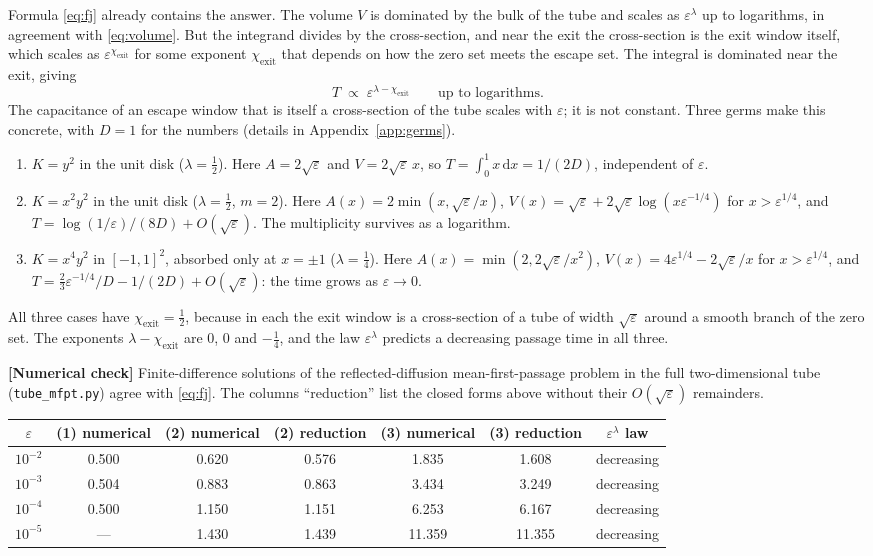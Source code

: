 \documentclass[11pt,a4paper]{article}
\newcommand{\eps}{\varepsilon}
\newcommand{\dd}{\mathrm d}
\newcommand{\chiexit}{\chi_{\mathrm{exit}}}
\newcommand{\evl}[2]{{\small\bfseries\color{#1}[#2]}}
\newcommand{\LNum}{\evl{cnum}{Numerical check}}
\begin{document}
Formula \eqref{eq:fj} already contains the answer. The volume $V$ is
dominated by the bulk of the tube and scales as $\eps^\lambda$ up to
logarithms, in agreement with \eqref{eq:volume}. But the integrand divides
by the cross-section, and near the exit the cross-section is the exit
window itself, which scales as $\eps^{\chiexit}$ for some exponent
$\chiexit$ that depends on how the zero set meets the escape set. The
integral is dominated near the exit, giving
\begin{equation}
T\;\propto\;\eps^{\lambda-\chiexit}\qquad\text{up to logarithms.}
\label{eq:scaling}
\end{equation}
The capacitance of an escape window that is itself a cross-section of the
tube scales with $\eps$; it is not constant. Three germs make this
concrete, with $D=1$ for the numbers (details in
Appendix~\ref{app:germs}).
\begin{enumerate}
\item $K=y^2$ in the unit disk ($\lambda=\tfrac12$). Here $A=2\sqrt\eps$
and $V=2\sqrt\eps\,x$, so $T=\int_0^1x\,\dd x=1/(2D)$, independent of
$\eps$.
\item $K=x^2y^2$ in the unit disk ($\lambda=\tfrac12$, $m=2$). Here
$A(x)=2\min(x,\sqrt\eps/x)$, $V(x)=\sqrt\eps+2\sqrt\eps\log(x\eps^{-1/4})$
for $x>\eps^{1/4}$, and $T=\log(1/\eps)/(8D)+O(\sqrt\eps)$. The
multiplicity survives as a logarithm.
\item $K=x^4y^2$ in $[-1,1]^2$, absorbed only at $x=\pm1$ ($\lambda=\tfrac14$).
Here $A(x)=\min(2,2\sqrt\eps/x^2)$, $V(x)=4\eps^{1/4}-2\sqrt\eps/x$ for
$x>\eps^{1/4}$, and $T=\tfrac23\eps^{-1/4}/D-1/(2D)+O(\sqrt\eps)$: the
time grows as $\eps\to0$.
\end{enumerate}
All three cases have $\chiexit=\tfrac12$, because in each the exit window
is a cross-section of a tube of width $\sqrt\eps$ around a smooth branch of
the zero set. The exponents $\lambda-\chiexit$ are $0$, $0$ and $-\tfrac14$,
and the law $\eps^\lambda$ predicts a decreasing passage time in all three.

\LNum{} Finite-difference solutions of the reflected-diffusion
mean-first-passage problem in the full two-dimensional tube
(\texttt{tube\_mfpt.py}) agree with \eqref{eq:fj}. The columns ``reduction''
list the closed forms above without their $O(\sqrt\eps)$ remainders.

\begin{center}\small
\begin{tabular}{@{}ccccccc@{}}
\toprule
$\eps$ & (1) numerical & (2) numerical & (2) reduction & (3) numerical & (3) reduction & $\eps^\lambda$ law \\
\midrule
$10^{-2}$ & 0.500 & 0.620 & 0.576 & 1.835 & 1.608 & decreasing \\
$10^{-3}$ & 0.504 & 0.883 & 0.863 & 3.434 & 3.249 & decreasing \\
$10^{-4}$ & 0.500 & 1.150 & 1.151 & 6.253 & 6.167 & decreasing \\
$10^{-5}$ & --- & 1.430 & 1.439 & 11.359 & 11.355 & decreasing \\
\bottomrule
\end{tabular}
\end{center}
\end{document}
